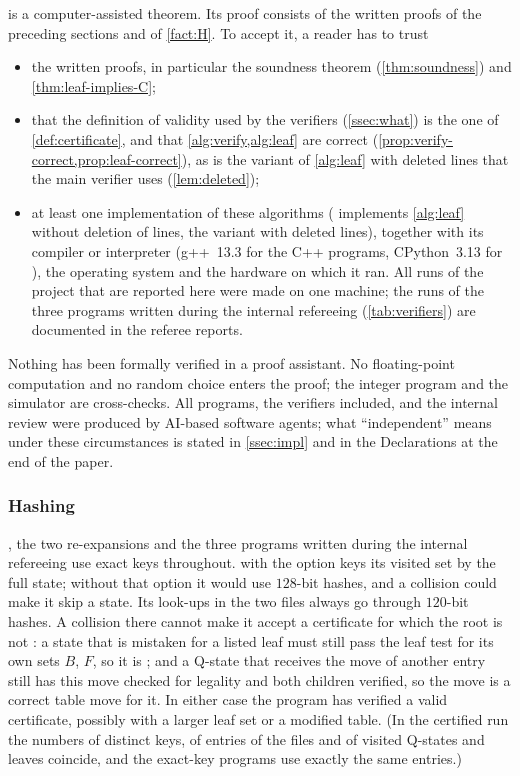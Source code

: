  is a computer-assisted theorem. Its proof consists of the written proofs of the
preceding sections and of \cref{fact:H}. To accept it, a reader has to trust
\begin{itemize}[leftmargin=1.6em]
\item the written proofs, in particular the soundness theorem (\cref{thm:soundness}) and
  \cref{thm:leaf-implies-C};
\item that the definition of validity used by the verifiers (\cref{ssec:what}) is the one of
  \cref{def:certificate}, and that \cref{alg:verify,alg:leaf} are correct
  (\cref{prop:verify-correct,prop:leaf-correct}), as is the variant of \cref{alg:leaf} with deleted
  lines that the main verifier uses (\cref{lem:deleted});
\item at least one implementation of these algorithms ( implements
  \cref{alg:leaf} without deletion of lines,  the variant with deleted lines),
  together with its compiler or interpreter
  (g++~13.3 for the C++ programs, CPython~3.13 for ), the operating system and the
  hardware on which it ran. All runs of the project that are reported here were made on one machine; the
  runs of the three programs written during the internal refereeing (\cref{tab:verifiers}) are documented
  in the referee reports.
\end{itemize}
Nothing has been formally verified in a proof assistant. No floating-point computation and no random
choice enters the proof; the integer program and the simulator are cross-checks. All programs, the
verifiers included, and the internal review were produced by AI-based software agents; what
``independent'' means under these circumstances is stated in \cref{ssec:impl} and in the Declarations at
the end of the paper.

\subsubsection*{Hashing}
, the two re-expansions and the three programs written during the internal refereeing
use exact keys throughout.  with the option
 keys its visited set by the full state; without that option it would use $128$-bit hashes, and
a collision could make it skip a state. Its look-ups in the two files always go through $120$-bit hashes.
A collision there cannot make it accept a certificate for which the root is not \WON: a state that is
mistaken for a listed leaf must still pass the leaf test for its own sets $B$, $F$, so it is \WON{};
and a Q-state that receives the move of another entry still has this move checked for legality and both
children verified, so the move is a correct table move for it. In either case the program has verified a
valid certificate, possibly with a larger leaf set or a modified table. (In the certified run the numbers
of distinct keys, of entries of the files and of visited Q-states and leaves coincide, and the exact-key programs use exactly
the same entries.)

